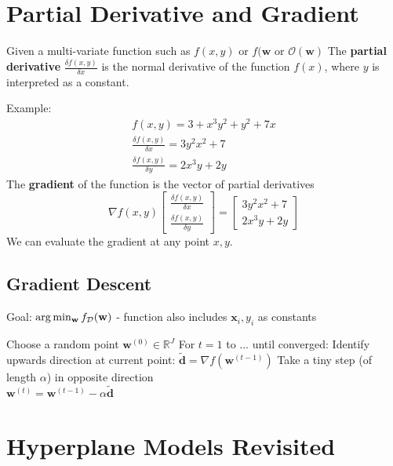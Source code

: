\documentclass{article}
\renewcommand{\vec}[1]{%
	\mathbf{#1}%
}
\begin{document}
	\section{Partial Derivative and Gradient}
	\begin{outline}
		\1 Given a multi-variate function such as $f(x,y)$ or $f(\vec{w}$ or $\mathcal{O}(\vec{w})$
		\1 The \textbf{partial derivative} $\frac{\delta f(x,y)}{\delta x}$ is the normal derivative of the function $f(x)$, where $y$ is interpreted as a constant.
	\end{outline}
	Example:
	\begin{align*}
		f(x,y) = 3 + x^3y^2 + y^2 + 7x\\
		\frac{\delta f(x,y)}{\delta x} = 3y^2x^2 + 7\\
		\frac{\delta f(x,y)}{\delta y} = 2x^3y + 2y
	\end{align*}
	The \textbf{gradient} of the function is the vector of partial derivatives
	\[ \nabla f(x,y) \begin{bmatrix} \frac{\delta f(x,y)}{\delta x} \\ \frac{\delta f(x,y)}{\delta y} \end{bmatrix} =
	\begin{bmatrix} 3y^2x^2 + 7\\2x^3y + 2y \end{bmatrix} \]
	We can evaluate the gradient at any point $x,y$.
	\subsection{Gradient Descent}
	Goal: $\arg \min_{\vec{w}} f_{\mathcal{D}}(\vec{w})$ - function also includes $\vec{x}_i, y_i$ as constants
	\begin{outline}
		\1 Choose a random point $\vec{w}^{(0)} \in \mathbb{R}^J$
		\1 For $t = 1$ to ... until converged:
		\2 Identify upwards direction at current point: $\vec{\tilde{d}} = \nabla f(\vec{w}^{(t-1)})$
		\2 Take a tiny step (of length $\alpha$) in opposite direction\\
		$\vec{w}^{(t)} = \vec{w}^{(t-1)} - \alpha \vec{\tilde{d}}$
	\end{outline}
	\section{Hyperplane Models Revisited}
\end{document}
